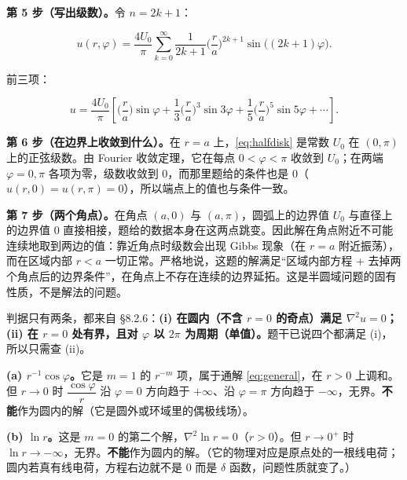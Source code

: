 \textbf{第 5 步（写出级数）。}令 $n=2k+1$：

\begin{equation}
u(r,\varphi)=\frac{4U_0}{\pi}\sum_{k=0}^{\infty}\frac{1}{2k+1}\Big(\frac{r}{a}\Big)^{2k+1}\sin\big((2k+1)\varphi\big).
\label{eq:halfdisk}
\end{equation}

前三项：

\[
u=\frac{4U_0}{\pi}\left[\Big(\frac ra\Big)\sin\varphi+\frac13\Big(\frac ra\Big)^{3}\sin3\varphi+\frac15\Big(\frac ra\Big)^{5}\sin5\varphi+\cdots\right].
\]

\textbf{第 6 步（在边界上收敛到什么）。}在 $r=a$ 上，\eqref{eq:halfdisk} 是常数 $U_0$ 在 $(0,\pi)$ 上的正弦级数。由 Fourier 收敛定理，它在每点 $0<\varphi<\pi$ 收敛到 $U_0$；在两端 $\varphi=0,\pi$ 各项为零，级数收敛到 $0$，而那里题给的条件也是 $0$（$u(r,0)=u(r,\pi)=0$），所以端点上的值也与条件一致。

\textbf{第 7 步（两个角点）。}在角点 $(a,0)$ 与 $(a,\pi)$，圆弧上的边界值 $U_0$ 与直径上的边界值 $0$ 直接相接，题给的数据本身在这两点跳变。因此解在角点附近不可能连续地取到两边的值：靠近角点时级数会出现 Gibbs 现象（在 $r=a$ 附近振荡），而在区域内部 $r<a$ 一切正常。严格地说，这题的解满足“区域内部方程 + 去掉两个角点后的边界条件”，在角点上不存在连续的边界延拓。这是半圆域问题的固有性质，不是解法的问题。



判据只有两条，都来自 \S8.2.6：\textbf{(i) 在圆内（不含 $r=0$ 的奇点）满足 $\nabla^2u=0$；(ii) 在 $r=0$ 处有界，且对 $\varphi$ 以 $2\pi$ 为周期（单值）。}题干已说四个都满足 (i)，所以只需查 (ii)。

\textbf{(a) $r^{-1}\cos\varphi$。}它是 $m=1$ 的 $r^{-m}$ 项，属于通解 \eqref{eq:general}，在 $r>0$ 上调和。但 $r\to0$ 时 $\dfrac{\cos\varphi}{r}$ 沿 $\varphi=0$ 方向趋于 $+\infty$、沿 $\varphi=\pi$ 方向趋于 $-\infty$，无界。\textbf{不能}作为圆内的解（它是圆外或环域里的偶极线场）。

\textbf{(b) $\ln r$。}这是 $m=0$ 的第二个解，$\nabla^2\ln r=0$（$r>0$）。但 $r\to0^+$ 时 $\ln r\to-\infty$，无界。\textbf{不能}作为圆内的解。（它的物理对应是原点处的一根线电荷；圆内若真有线电荷，方程右边就不是 $0$ 而是 $\delta$ 函数，问题性质就变了。）

